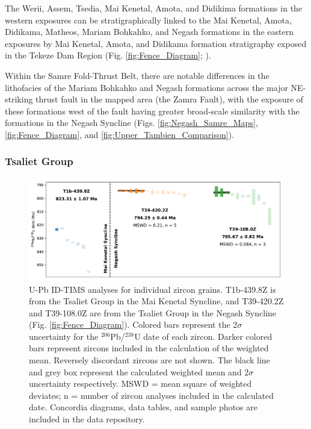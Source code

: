\documentclass[11pt,letterpaper]{article}
\newcommand{\UPb}{$^{206}$Pb/$^{238}$U\xspace}
\begin{document}
The Werii, Assem, Tsedia, Mai Kenetal, Amota, and Didikima formations in the western exposures can be stratigraphically linked to the Mai Kenetal, Amota, Didikama, Matheos, Mariam Bohkahko, and Negash formations in the eastern exposures by Mai Kenetal, Amota, and Didikama formation stratigraphy exposed in the Tekeze Dam Region (Fig. \ref{fig:Fence_Diagram}; \citealp{Swanson-Hysell2015a}).

Within the Samre Fold-Thrust Belt, there are notable differences in the lithofacies of the Mariam Bohkahko and Negash formations across the major NE-striking thrust fault in the mapped area (the Zamra Fault), with the exposure of these formations west of the fault having greater broad-scale similarity with the formations in the Negash Syncline (Figs. \ref{fig:Negash_Samre_Maps}, \ref{fig:Fence_Diagram}, and \ref{fig:Upper_Tambien_Comparison}).

\subsubsection*{Tsaliet Group}

\begin{figure}[h!]
\begin{center}
	\includegraphics[width=5 in]{Figures/Geochronology.pdf}
	\caption{U-Pb ID-TIMS analyses for individual zircon grains. T1b-439.8Z is from the Tsaliet Group in the Mai Kenetal Syncline, and T39-420.2Z and T39-108.0Z are from the Tsaliet Group in the Negash Syncline (Fig. \ref{fig:Fence_Diagram}). Colored bars represent the 2$\sigma$ uncertainty for the \UPb date of each zircon. Darker colored bars represent zircons included in the calculation of the weighted mean. Reversely discordant zircons are not shown. The black line and grey box represent the calculated weighted mean and 2$\sigma$ uncertainty respectively. MSWD = mean square of weighted deviates; n = number of zircon analyses included in the calculated date. Concordia diagrams, data tables, and sample photos are included in the data repository.}
	\label{fig:Geochronology}
\end{center}
\end{figure}
\end{document}
